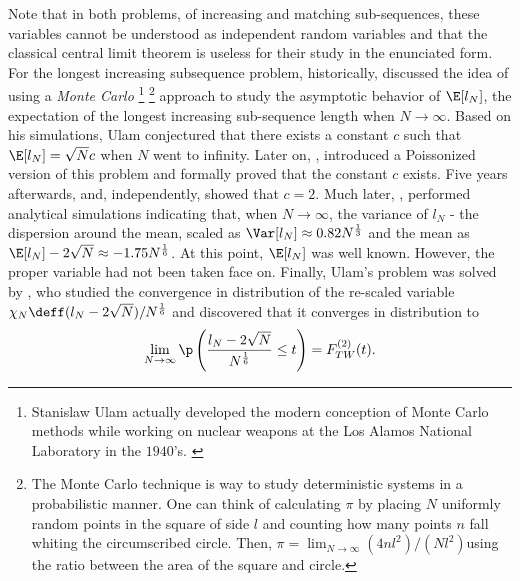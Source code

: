 Note that in both problems, of increasing and matching sub-sequences, these variables cannot be understood as independent random variables and that the classical central limit theorem is useless for their study in the enunciated form. For the longest increasing subsequence problem, historically,  discussed the idea of using a \textit{Monte Carlo} \footnote{Stanislaw Ulam actually developed the modern conception of Monte Carlo methods while working on nuclear weapons at the Los Alamos National Laboratory in the $1940$'s. \cite{MonteCarlo}} \footnote{The Monte Carlo technique is way to study deterministic systems in a probabilistic manner. One can think of calculating $\pi$ by placing $N$ uniformly random points in the square of side $l$ and counting how many points $n$ fall whiting the circumscribed circle. Then, $\pi = 	\lim_{N\rightarrow \infty} (4 n l^2)/(N l^2)$using the ratio between the area of the square and circle.} approach to study the asymptotic behavior of $\E[l_N]$, the expectation of the longest increasing sub-sequence length when $N \rightarrow \infty$. Based on his simulations, Ulam conjectured that there exists a constant $c$ such that $\E[l_N] = \sqrt{N}c$ when $N$ went to infinity. Later on, , introduced a Poissonized version of this problem and formally proved that the constant $c$ exists. Five years afterwards,  and, independently,  showed that $c = 2$. Much later, , performed analytical simulations indicating that, when $N \rightarrow \infty$, the variance of $l_N$ - the dispersion around the mean, scaled as $\Var[l_N] \approx 0.82 N^{\frac{1}{3}}$ and the mean as $\E[l_N] - 2\sqrt{N} \approx -1.75 N^{\frac{1}{6}}$. At this point, $\E[l_N]$ was well known. However, the proper variable had not been taken face on. Finally, Ulam's problem was solved by , who studied the convergence in distribution of the re-scaled variable $ \chi_N \deff (l_N - 2\sqrt{N})/ N^{\frac{1}{6}}$ and discovered that it converges in distribution to 
\begin{equation}
	\lim_{N \rightarrow \infty} \p\left( \frac{l_N - 2\sqrt{N}}{N^{\frac{1}{6}}} \leq t \right) = F_{TW}^{(2)}(t).
\end{equation} 


